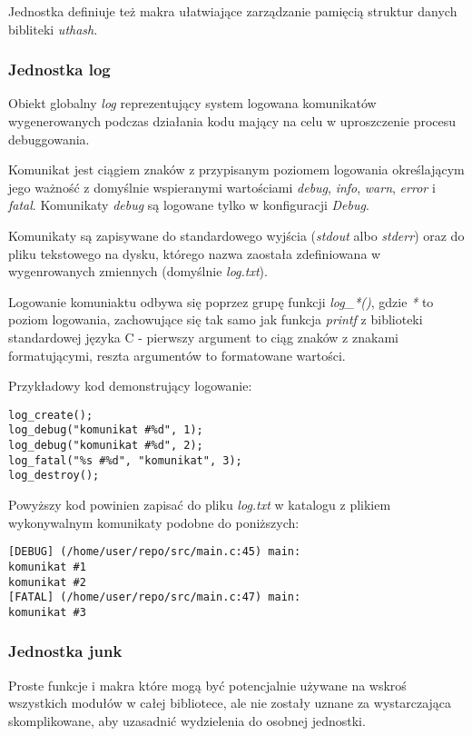 Jednostka definiuje też makra ułatwiające zarządzanie pamięcią struktur danych bibliteki \textit{uthash}.


\subsubsection{Jednostka log}
Obiekt globalny \textit{log} reprezentujący system logowana komunikatów wygenerowanych podczas działania kodu mający na celu w uproszczenie procesu debuggowania.

Komunikat jest ciągiem znaków z przypisanym poziomem logowania określającym jego ważność z domyślnie wspieranymi wartościami \textit{debug}, \textit{info}, \textit{warn}, \textit{error} i \textit{fatal}.
Komunikaty \textit{debug} są logowane tylko w konfiguracji \textit{Debug}.

Komunikaty są zapisywane do standardowego wyjścia (\textit{stdout} albo \textit{stderr}) oraz do pliku tekstowego na dysku, którego nazwa zaostała zdefiniowana w wygenrowanych zmiennych (domyślnie \textit{log.txt}).

Logowanie komuniaktu odbywa się poprzez grupę funkcji \textit{log\_*()}, gdzie \textit{*} to poziom logowania, zachowujące się tak samo jak funkcja \textit{printf} z biblioteki standardowej języka C - pierwszy argument to ciąg znaków z znakami formatującymi, reszta argumentów to formatowane wartości.

Przykładowy kod demonstrujący logowanie:
\lstset{language=C}
\begin{lstlisting}
log_create();
log_debug("komunikat #%d", 1);
log_debug("komunikat #%d", 2);
log_fatal("%s #%d", "komunikat", 3);
log_destroy();
\end{lstlisting}

Powyższy kod powinien zapisać do pliku \textit{log.txt} w katalogu z plikiem wykonywalnym komunikaty podobne do poniższych:
\begin{verbatim}
[DEBUG] (/home/user/repo/src/main.c:45) main:
komunikat #1
komunikat #2
[FATAL] (/home/user/repo/src/main.c:47) main:
komunikat #3
\end{verbatim}

\subsubsection{Jednostka junk}
Proste funkcje i makra które mogą być potencjalnie używane na wskroś wszystkich modułów w całej bibliotece, ale nie zostały uznane za wystarczająca skomplikowane, aby uzasadnić wydzielenia do osobnej jednostki.


